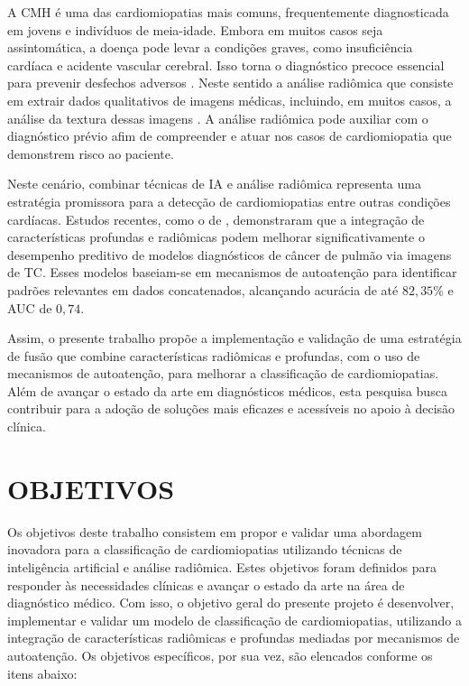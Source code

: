 A \gls{CMH} é uma das cardiomiopatias mais comuns, frequentemente diagnosticada em jovens e indivíduos de meia-idade. Embora em muitos casos seja assintomática, a doença pode levar a condições graves, como insuficiência cardíaca e acidente vascular cerebral. Isso torna o diagnóstico precoce essencial para prevenir desfechos adversos \cite{kwonComparisonMortalityCause2022}. Neste sentido a análise radiômica que consiste em extrair dados qualitativos de imagens médicas, incluindo, em muitos casos, a análise da textura dessas imagens \cite{lambinRadiomicsExtractingMore2012}. A análise radiômica pode auxiliar com o diagnóstico prévio afim de compreender e atuar nos casos de cardiomiopatia que demonstrem risco ao paciente.

Neste cenário, combinar técnicas de \gls{IA} e análise radiômica representa uma estratégia promissora para a detecção de cardiomiopatias entre outras condições cardíacas. Estudos recentes, como o de , demonstraram que a integração de características profundas e radiômicas podem melhorar significativamente o desempenho preditivo de modelos diagnósticos de câncer de pulmão via imagens de \gls{TC}. Esses modelos baseiam-se em mecanismos de autoatenção para identificar padrões relevantes em dados concatenados, alcançando acurácia de até $82,35\%$ e \gls{AUC} de $0,74$.

Assim, o presente trabalho propõe a implementação e validação de uma estratégia de fusão que combine características radiômicas e profundas, com o uso de mecanismos de autoatenção, para melhorar a classificação de cardiomiopatias. Além de avançar o estado da arte em diagnósticos médicos, esta pesquisa busca contribuir para a adoção de soluções mais eficazes e acessíveis no apoio à decisão clínica.

\section{OBJETIVOS}
\label{sec:cap1_objetivo}

Os objetivos deste trabalho consistem em propor e validar uma abordagem inovadora para a classificação de cardiomiopatias utilizando técnicas de inteligência artificial e análise radiômica. Estes objetivos foram definidos para responder às necessidades clínicas e avançar o estado da arte na área de diagnóstico médico. Com isso, o objetivo geral do presente projeto é desenvolver, implementar e validar um modelo de classificação de cardiomiopatias, utilizando a integração de características radiômicas e profundas mediadas por mecanismos de autoatenção. Os objetivos específicos, por sua vez, são elencados conforme os itens abaixo:


